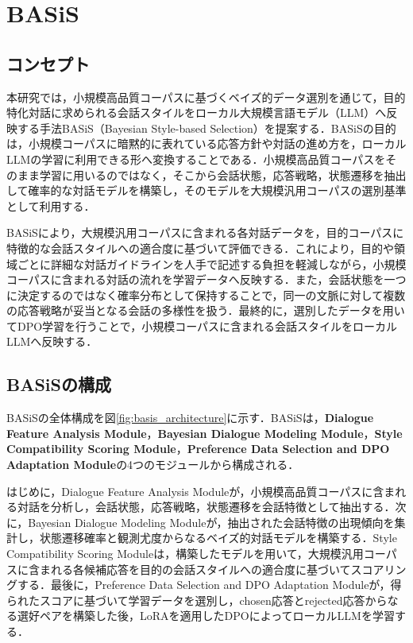 \documentclass[manuscript,review,anonymous]{acmart}
\begin{document}
\section{BASiS}
\label{sec:method}

\subsection{コンセプト}
\label{sec:method_concept}

本研究では，小規模高品質コーパスに基づくベイズ的データ選別を通じて，目的特化対話に求められる会話スタイルをローカル大規模言語モデル（LLM）へ反映する手法BASiS（Bayesian Style-based Selection）を提案する．BASiSの目的は，小規模コーパスに暗黙的に表れている応答方針や対話の進め方を，ローカルLLMの学習に利用できる形へ変換することである．小規模高品質コーパスをそのまま学習に用いるのではなく，そこから会話状態，応答戦略，状態遷移を抽出して確率的な対話モデルを構築し，そのモデルを大規模汎用コーパスの選別基準として利用する．

BASiSにより，大規模汎用コーパスに含まれる各対話データを，目的コーパスに特徴的な会話スタイルへの適合度に基づいて評価できる．これにより，目的や領域ごとに詳細な対話ガイドラインを人手で記述する負担を軽減しながら，小規模コーパスに含まれる対話の流れを学習データへ反映する．また，会話状態を一つに決定するのではなく確率分布として保持することで，同一の文脈に対して複数の応答戦略が妥当となる会話の多様性を扱う．最終的に，選別したデータを用いてDPO学習を行うことで，小規模コーパスに含まれる会話スタイルをローカルLLMへ反映する．

\subsection{BASiSの構成}
\label{sec:method_architecture}

BASiSの全体構成を図\ref{fig:basis_architecture}に示す．BASiSは，\textbf{Dialogue Feature Analysis Module}，\textbf{Bayesian Dialogue Modeling Module}，\textbf{Style Compatibility Scoring Module}，\textbf{Preference Data Selection and DPO Adaptation Module}の4つのモジュールから構成される．

はじめに，Dialogue Feature Analysis Moduleが，小規模高品質コーパスに含まれる対話を分析し，会話状態，応答戦略，状態遷移を会話特徴として抽出する．次に，Bayesian Dialogue Modeling Moduleが，抽出された会話特徴の出現傾向を集計し，状態遷移確率と観測尤度からなるベイズ的対話モデルを構築する．Style Compatibility Scoring Moduleは，構築したモデルを用いて，大規模汎用コーパスに含まれる各候補応答を目的の会話スタイルへの適合度に基づいてスコアリングする．最後に，Preference Data Selection and DPO Adaptation Moduleが，得られたスコアに基づいて学習データを選別し，chosen応答とrejected応答からなる選好ペアを構築した後，LoRAを適用したDPOによってローカルLLMを学習する．
\end{document}
